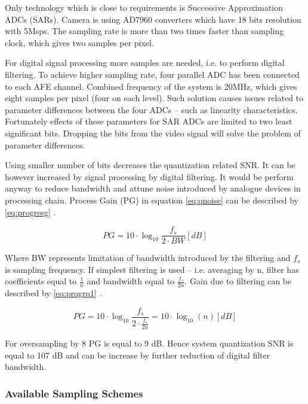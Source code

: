 Only technology which is close to requirements is Successive Approximation ADCs (SARs). Camera is using AD7960 converters which have 18 bits resolution with 5Msps. The sampling rate is more than two times faster than sampling clock, which gives two samples per pixel. 

For digital signal processing more samples are needed, i.e. to perform digital filtering. To achieve higher sampling rate, four parallel ADC has been connected to each AFE channel. Combined frequency of the system is 20MHz, which gives eight samples per pixel (four on each level). Such solution causes issues related to parameter differences between the four ADCs -- such as linearity characteristics. Fortunately effects of these parameters for SAR ADCs are limited to two least significant bits. Dropping the bits from the video signal will solve the problem of parameter differences.

Using smaller number of bits decreases the quantization related SNR. It can be however increased by signal processing by digital filtering. It would be perform anyway to reduce bandwidth and attune noise introduced by analogue devices in processing chain. Process Gain (PG) in equation \ref{eq:qnoise} can be described by \ref{eq:progresg} \cite{mt-001}.

\begin{equation}
\label{eq:progresg}
PG = 10 \cdot \log_{10}\frac{f_{s}}{2 \cdot BW} [dB]
\end{equation}

Where BW represents limitation of bandwidth introduced by the filtering and $f_{s}$ is sampling frequency. If simplest filtering is used -- i.e. averaging by n, filter has coefficients equal to $\frac{1}{n}$ and bandwidth equal to $\frac{f_{s}}{2n}$. Gain due to filtering can be described by \ref{eq:progrq1} \cite{mt-001}.

\begin{equation}
\label{eq:progrq1}
PG = 10 \cdot \log_{10}\frac{f_{s}}{2\cdot\frac{f_{s}}{2n}} = 10\cdot\log_{10}(n)[dB]
\end{equation}

For oversampling by 8 PG is equal to 9 dB. Hence system quantization SNR is equal to 107 dB and can be increase by further reduction of digital filter bandwidth.

\subsubsection{Available Sampling Schemes}

